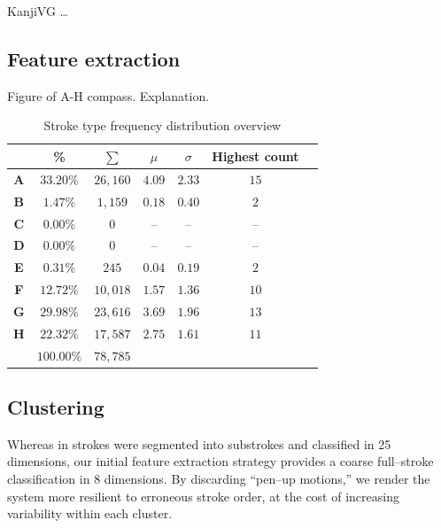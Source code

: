 \documentclass[10pt,conference,a4paper]{IEEEtran}
\begin{document}
	KanjiVG \ldots


	\subsection{Feature extraction}

	Figure of A-H compass. Explanation.

	\begin{table}
		\renewcommand{\arraystretch}{1.3}
		\caption{Stroke type frequency distribution overview }
		\label{tbl_stroke_analysis}
		\centering
		\begin{tabular}{ c | c c c c c l }
			\hline
			  & \bfseries \% & \small $\sum$ & $\mu$ & $\sigma$ & Highest count \\ 
			\hline
			\hline
			\bfseries A & $33.20\%$ & $26,160$ & $4.09$ & $2.33$ & $15$ & \\%
			\bfseries B & $1.47\%$  & $1,159$  & $0.18$ & $0.40$ & $2$  & \\%
			\bfseries C & $0.00\%$  & $0$      & --     & --     & --   & \\%
			\bfseries D & $0.00\%$  & $0$      & --     & --     & --   & \\%
			\bfseries E & $0.31\%$  & $245$    & $0.04$ & $0.19$ & $2$  & \\%
			\bfseries F & $12.72\%$ & $10,018$ & $1.57$ & $1.36$ & $10$ & \\%
			\bfseries G & $29.98\%$ & $23,616$ & $3.69$ & $1.96$ & $13$ & \\%
			\bfseries H & $22.32\%$ & $17,587$ & $2.75$ & $1.61$ & $11$ & \\%
			\hline
			            & $100.00\%$   & $78,785$ &        &        &      & \\
			\hline
		\end{tabular}
	\end{table}



	\subsection{Clustering}

	Whereas in \cite{nakai2001substroke} strokes were segmented into substrokes and classified in
	25 dimensions, our initial feature extraction strategy provides a coarse full--stroke classification
	in 8 dimensions. By discarding ``pen--up motions,'' we render the system more resilient to erroneous
	stroke order, at the cost of increasing variability within each cluster.
\end{document}
